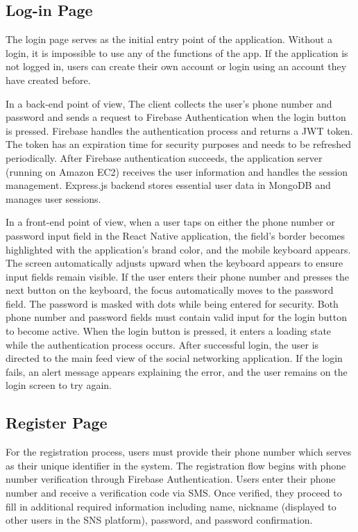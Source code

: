 \documentclass[conference]{IEEEtran}
\begin{document}
\subsection{Log-in Page}
        The login page serves as the initial entry point of the application. Without a login, it is impossible to use any of the functions of the app. If the application is not logged in, users can create their own account or login using an account they have created before.

        In a back-end point of view, The client collects the user's phone number and password and sends a request to Firebase Authentication when the login button is pressed. Firebase handles the authentication process and returns a JWT token. The token has an expiration time for security purposes and needs to be refreshed periodically. After Firebase authentication succeeds, the application server (running on Amazon EC2) receives the user information and handles the session management. Express.js backend stores essential user data in MongoDB and manages user sessions.

        In a front-end point of view, when a user taps on either the phone number or password input field in the React Native application, the field's border becomes highlighted with the application's brand color, and the mobile keyboard appears. The screen automatically adjusts upward when the keyboard appears to ensure input fields remain visible. If the user enters their phone number and presses the next button on the keyboard, the focus automatically moves to the password field. The password is masked with dots while being entered for security. Both phone number and password fields must contain valid input for the login button to become active. When the login button is pressed, it enters a loading state while the authentication process occurs. After successful login, the user is directed to the main feed view of the social networking application. If the login fails, an alert message appears explaining the error, and the user remains on the login screen to try again.

    \subsection{Register Page}
        For the registration process, users must provide their phone number which serves as their unique identifier in the system. The registration flow begins with phone number verification through Firebase Authentication. Users enter their phone number and receive a verification code via SMS. Once verified, they proceed to fill in additional required information including name, nickname (displayed to other users in the SNS platform), password, and password confirmation.
\end{document}
